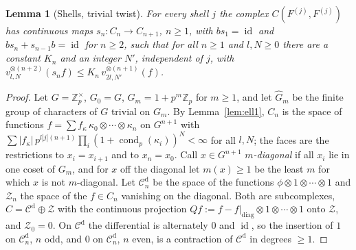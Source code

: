 \documentclass[11pt]{amsart}
\newtheorem{lemma}[theorem]{Lemma}
\theoremstyle{definition}
\theoremstyle{remark}
\newcommand{\Z}{\mathbb Z}
\newcommand{\id}{\operatorname{id}}
\newcommand{\cond}{\operatorname{cond}}
\begin{document}
\begin{lemma}[Shells, trivial twist]\label{lem:shelluntw}
For every shell $j$ the complex $C(F^{(j)},F^{(j)})$ has continuous maps
$s_n:C_n\to C_{n+1}$, $n\ge1$, with $bs_1=\id$ and $bs_n+s_{n-1}b=\id$ for
$n\ge2$, such that for all $n\ge1$ and $l,N\ge0$ there are a constant $K_n$ and
an integer $N'$, independent of $j$, with
$v_{l,N}^{\otimes(n+2)}(s_nf)\le K_n\,v_{2l,N'}^{\otimes(n+1)}(f)$.
\end{lemma}

\begin{proof}
Let $G=\Z_p^{\times}$, $G_0=G$, $G_m=1+p^{m}\Z_p$ for $m\ge1$, and let
$\widehat G_m$ be the finite group of characters of $G$ trivial on $G_m$.  By
Lemma~\ref{lem:ell1}, $C_n$ is the space of functions
$f=\sum f_{\kappa}\,\kappa_0\otimes\cdots\otimes\kappa_n$ on $G^{n+1}$ with
$\sum|f_{\kappa}|\,p^{l|j|(n+1)}\prod_i(1+\cond_p(\kappa_i))^{N}<\infty$ for all
$l,N$; the faces are the restrictions to $x_i=x_{i+1}$ and to $x_n=x_0$.  Call
$x\in G^{n+1}$ \emph{$m$-diagonal} if all $x_i$ lie in one coset of $G_m$, and
for $x$ off the diagonal let $m(x)\ge1$ be the least $m$ for which $x$ is not
$m$-diagonal.  Let $\mathcal C^{\mathrm d}_n$ be the space of the functions
$\phi\otimes1\otimes\cdots\otimes1$ and $\mathcal Z_n$ the space of the
$f\in C_n$ vanishing on the diagonal.  Both are subcomplexes,
$C=\mathcal C^{\mathrm d}\oplus\mathcal Z$ with the continuous projection
$Qf:=f-f|_{\mathrm{diag}}\otimes1\otimes\cdots\otimes1$ onto $\mathcal Z$, and
$\mathcal Z_0=0$.  On $\mathcal C^{\mathrm d}$ the differential is alternately $0$ and
$\id$, so the insertion of $1$ on $\mathcal C^{\mathrm d}_n$, $n$ odd, and $0$ on
$\mathcal C^{\mathrm d}_n$, $n$ even, is a contraction of $\mathcal C^{\mathrm
d}$ in degrees $\ge1$.


\end{proof}
\end{document}
